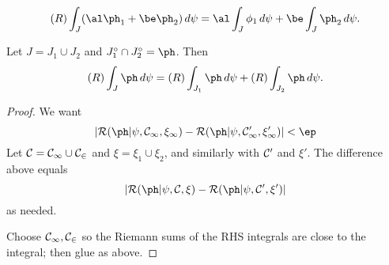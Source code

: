 \begin{ex}
\[
(R)\int_J (\al \ph_1+\be \ph_2)\,d\psi=
\al \int_J \phi_1\,d\psi +\be \int_J\ph_2\,d\psi.
\]
\end{ex}
\begin{ex}
Let $J=J_1\cup J_2$ and $J_1^{\circ}\cap J_2^{\circ}=\ph$. Then
\[
(R)\int_J \ph\,d\psi=(R)\int_{J_1} \ph\,d\psi+(R)\int_{J_2}\ph\,d\psi.
\]
\end{ex}
\begin{proof}
We want
\[
|\cal R(\ph|\psi, \cal C_1,\xi_1)
-
\cal R(\ph|\psi, \cal C_1', \xi_1')|<\ep
\]
Let $\cal C=\cal C_1\cup \cal C_2$ and $\xi=\xi_1\cup \xi_2$, and similarly with $\cal C'$ and $\xi'$. The difference above equals
\[
|\cal R(\ph|\psi, \cal C,\xi)
-
\cal R(\ph|\psi, \cal C', \xi')|
\]
as needed. 

Choose $\cal C_1,\cal C_2$ so the Riemann sums of the RHS integrals are close to the integral; then glue as above.
\end{proof}